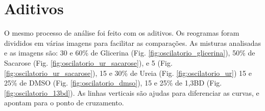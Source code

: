 	\FloatBarrier
	
	\section{Aditivos}
	
	O mesmo processo de análise foi feito com os aditivos. Os reogramas foram divididos em várias imagens para facilitar as comparações. As misturas analisadas e as imagens são: 30 e 60\% de Glicerina (Fig. \ref{fig:oscilatorio_glicerina}), 50\% de Sacarose (Fig. \ref{fig:oscilatorio_ur_sacarose}), e 5 (Fig. \ref{fig:oscilatorio_ur_sacarose}), 15 e 30\% de Ureia (Fig. \ref{fig:oscilatorio_ur}) 15 e 25\% de DMSO (Fig. \ref{fig:oscilatorio_dmso}), 15 e 25\% de 1,3BD (Fig. \ref{fig:oscilatorio_13bd}). As linhas verticais são ajudas para diferenciar as curvas, e apontam para o ponto de cruzamento.
	
